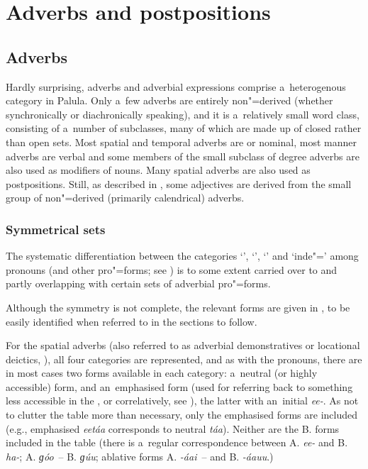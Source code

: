 \chapter{Adverbs and postpositions}
\label{chap:7}

\section{Adverbs}
\label{sec:7-1}


Hardly surprising, adverbs and adverbial expressions comprise a~heterogenous category in Palula. Only a~few adverbs are entirely non"=derived (whether synchronically or diachronically speaking), and it is a~relatively small word class, consisting of a~number of subclasses, many of which are made up of closed rather than open sets. Most spatial and temporal adverbs are  or nominal, most manner adverbs are verbal and some members of the small subclass of degree adverbs are also used as modifiers of nouns. Many spatial adverbs are also used as postpositions. Still, as described in , some adjectives are derived from the small group of non"=derived (primarily calendrical) adverbs.


\subsection{Symmetrical  sets}
\label{subsec:7-1-1}

The systematic differentiation between the categories `', `', `' and `inde"=' among pronouns (and other pro"=forms; see ) is to some extent carried over to and partly overlapping with certain sets of adverbial pro"=forms. 



Although the symmetry is not complete, the relevant forms are given in , to be easily identified when referred to in the sections to follow.



For the spatial adverbs (also referred to as adverbial demonstratives or locational deictics, \citealt[431]{diessel2006}), all four categories are represented, and as with the pronouns, there are in most cases two forms available in each category: a~neutral (or highly accessible) form, and an~emphasised form (used for referring back to something less accessible in the , or correlatively, see ), the latter with an~initial \textit{ee-}. As not to clutter the table more than necessary, only the emphasised forms are included (e.g., emphasised \textit{eetáa} corresponds to neutral \textit{táa}). Neither are the B. forms included in the table (there is a~regular correspondence between A. \textit{ee-} and B. \textit{ha-}; A. \textit{ɡóo}~-- B. \textit{ɡúu}; ablative forms A. \textit{-áai}~-- and B. \textit{-áauu}.)



